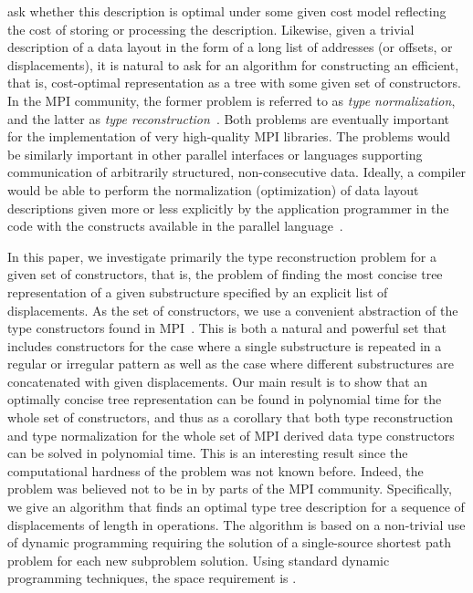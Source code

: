 \documentclass[a4paper,11pt]{article}
\begin{document}
ask whether this description is optimal under some given cost model
reflecting the cost of storing or processing the
description. Likewise, given a trivial description of a data layout in
the form of a long list of addresses (or offsets, or displacements),
it is natural to ask for an algorithm for constructing an efficient,
that is, cost-optimal representation as a tree with some given set of
constructors. In the MPI community, the former problem is referred to
as \emph{type normalization}, and the latter as \emph{type
  reconstruction}~\cite{Traff11:typeguide}. Both problems are
eventually important for the implementation of very high-quality MPI
libraries. The problems would be similarly important in other parallel
interfaces or languages supporting communication of arbitrarily
structured, non-consecutive data. Ideally, a compiler would be able to
perform the normalization (optimization) of data layout descriptions
given more or less explicitly by the application programmer in the
code with the constructs available in the parallel
language~\cite{SchneiderKjolstadHoefler13}.

In this paper, we investigate primarily the type reconstruction
problem for a given set of constructors, that is, the problem of
finding the most concise tree representation of a given substructure
specified by an explicit list of displacements. As the set of
constructors, we use a convenient abstraction of the type constructors
found in MPI~\cite[Chapter 4]{MPI-3.0}. This is both a natural and
powerful set that includes constructors for the case where a single
substructure is repeated in a regular or irregular pattern as well as
the case where different substructures are concatenated with given
displacements. Our main result is to show that an optimally concise
tree representation can be found in polynomial time for the whole set
of constructors, and thus as a corollary that both type reconstruction
and type normalization for the whole set of MPI derived data type
constructors can be solved in polynomial time.  This is an interesting
result since the computational hardness of the problem was not known
before.  Indeed, the problem was believed not to be in  by parts of
the MPI community. Specifically, we give an algorithm that finds an
optimal type tree description for a sequence of displacements of
length  in  operations. The algorithm is based on a
non-trivial use of dynamic programming requiring the solution of a
single-source shortest path problem for each new subproblem
solution. Using standard dynamic programming techniques, the space
requirement is .
\end{document}
